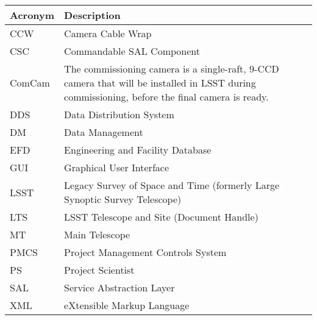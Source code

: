 \addtocounter{table}{-1}
\begin{longtable}{p{}p{}}\hline
\textbf{Acronym} & \textbf{Description}  \\\hline

CCW & Camera Cable Wrap \\\hline
CSC & Commandable SAL Component \\\hline
ComCam & The commissioning camera is a single-raft, 9-CCD camera that will be installed in LSST during commissioning, before the final camera is ready. \\\hline
DDS & Data Distribution System \\\hline
DM & Data Management \\\hline
EFD & Engineering and Facility Database \\\hline
GUI & Graphical User Interface \\\hline
LSST & Legacy Survey of Space and Time (formerly Large Synoptic Survey Telescope) \\\hline
LTS & LSST Telescope and Site  (Document Handle) \\\hline
MT & Main Telescope \\\hline
PMCS & Project Management Controls System \\\hline
PS & Project Scientist \\\hline
SAL & Service Abstraction Layer \\\hline
XML & eXtensible Markup Language \\\hline
\end{longtable}
